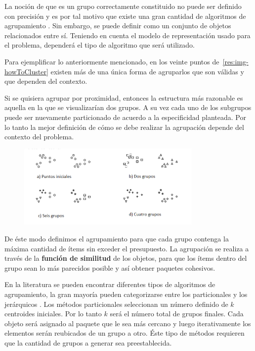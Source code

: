 La noción de que es un grupo correctamente constituido no puede ser definido con precisión y es por tal motivo que existe una gran cantidad de algoritmos de agrupamiento \cite{Estivill-Castro:2002:WSM:568574.568575}. Sin embargo, se puede definir como un conjunto de objetos relacionados entre sí. Teniendo en cuenta el modelo de representación usado para el problema, dependerá el tipo de algoritmo que será utilizado.

Para ejemplificar lo anteriormente mencionado, en los veinte puntos de~\autoref{res:img-howToCluster} existen más de una única forma de agruparlos que son válidas y que dependen del contexto. 

Si se quisiera agrupar por proximidad, entonces la estructura más razonable es aquella en la que se visualizarían dos grupos. A su vez cada uno de los subgrupos puede ser nuevamente particionado de acuerdo a la especificidad planteada. Por lo tanto la mejor definición de cómo se debe realizar la agrupación depende del contexto del problema.

\begin{figure}[H]
  \centering
   \includegraphics[width=0.8\textwidth]{img/howToCluster.png}
   \caption{}
   \label{res:img-howToCluster}
\end{figure}

De éste modo definimos el agrupamiento para que cada grupo contenga la máxima cantidad de ítems sin exceder el presupuesto. La agrupación se realiza a través de la \textbf{función de similitud} de los objetos, para que los ítems dentro del grupo sean lo más parecidos posible y así obtener paquetes cohesivos.

En la literatura se pueden encontrar diferentes tipos de algoritmos de agrupamiento, la gran mayoría pueden categorizarse entre los particionales y los jerárquicos \cite{opac-b1087461}. Los métodos particionales seleccionan un número definido de $k$ centroides iniciales. Por lo tanto $k$ será el número total de grupos finales. Cada objeto será asignado al paquete que le sea más cercano y luego iterativamente los elementos serán reubicados de un grupo a otro. Éste tipo de métodos requieren que la cantidad de grupos a generar sea preestablecida. 

